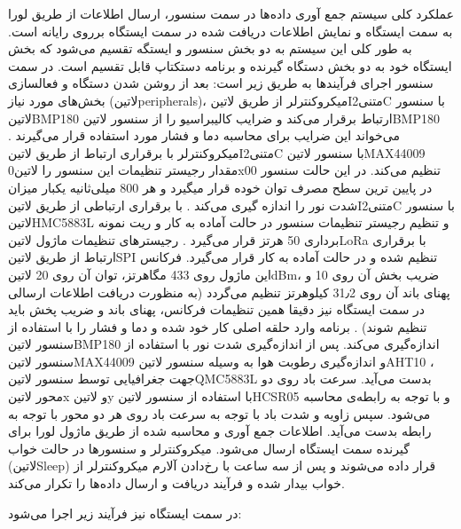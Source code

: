 عملکرد کلی سیستم جمع آوری داده‌ها در سمت سنسور، ارسال اطلاعات از طریق لورا به سمت ایستگاه و نمایش اطلاعات دریافت شده در سمت ایستگاه برروی رایانه است. به طور کلی این سیستم به دو بخش سنسور و ایستگه تقسیم می‌شود که بخش ایستگاه خود به دو بخش دستگاه گیرنده و برنامه دستکتاپ قابل تقسیم است. در سمت سنسور اجرای فرآیند‌ها به طریق زیر است: 
بعد از روشن شدن دستگاه و فعالسازی بخش‌های مورد نیاز (‌لاتین{peripherals})، میکروکنترلر از طریق ‌لاتین{I‌متنی{2}C} با سنسور ‌لاتین{BMP180} ارتباط برقرار می‌کند و ضرایب کالیبراسیو را از سنسور ‌لاتین{BMP180} می‌خواند این ضرایب برای محاسبه دما و فشار مورد استفاده قرار می‌گیرند .
میکروکنترلر با برقراری ارتباط از طریق ‌لاتین{I‌متنی{2}C} با سنسور ‌لاتین{MAX44009} مقدار رجیستر تنظیمات این سنسور را ‌لاتین{0x00} تنظیم می‌کند. در این حالت سنسور در پایین ترین سطح مصرف توان خوده قرار میگیرد و هر 800 میلی‌ثانیه یکبار میزان شدت نور را اندازه گیری می‌کند .
با برقراری ارتباطی از طریق ‌لاتین{I‌متنی{2}C} با سنسور ‌لاتین{HMC5883L} و تنظیم رجیستر تنظیمات سنسور در حالت آماده به کار و ریت نمونه برداری 50 هرتز قرار می‌گیرد .
رجیستر‌های تنظیمات ماژول ‌لاتین{LoRa} با برقراری ارتباط از طریق ‌لاتین{SPI} تنظیم شده و در حالت آماده به کار قرار می‌گیرد. فرکانس این ماژول روی 433 مگاهرتز، توان آن روی 20 ‌لاتین{dBm}، ضریب بخش آن روی 10 و پهنای باند آن روی 31٫2 کیلوهرتز تنظیم می‌گردد (به منظورت دریافت اطلاعات ارسالی در سمت ایستگاه نیز دقیقا همین تنظیمات فرکانس، پهنای باند و ضریب پخش باید تنظیم شوند) .
برنامه وارد حلقه اصلی کار خود شده و دما و فشار را با استفاده از سنسور ‌لاتین{BMP180} اندازه‌گیری می‌کند. 
پس از اندازه‌گیری شدت نور با استفاده از سنسور ‌لاتین{MAX44009}  و اندازه‌گیری رطوبت هوا به وسیله سنسور ‌لاتین{AHT10} ، جهت جغرافیایی توسط سنسور ‌لاتین{QMC5883L}  بدست می‌آید. 
سرعت باد روی دو محور ‌لاتین{x} و ‌لاتین{y} با استفاده از سنسور ‌لاتین{HCSR05} و با توجه به رابطه‌ی  محاسبه می‌شود. سپس زاویه و شدت باد با توجه به سرعت باد روی هر دو محور با توجه به رابطه  بدست می‌آید.
اطلاعات جمع آوری و محاسبه شده از طریق ماژول لورا برای گیرنده سمت ایستگاه ارسال می‌شود.
میکروکنترلر و سنسور‌ها در حالت خواب (‌لاتین{Sleep}) قرار داده می‌شوند و پس از سه ساعت با رخ‌دادن آلارم میکرو‌کنترلر از خواب بیدار شده و فرآیند دریافت و ارسال داده‌ها را تکرار می‌کند.

در سمت ایستگاه نیز فرآیند زیر اجرا می‌شود:

